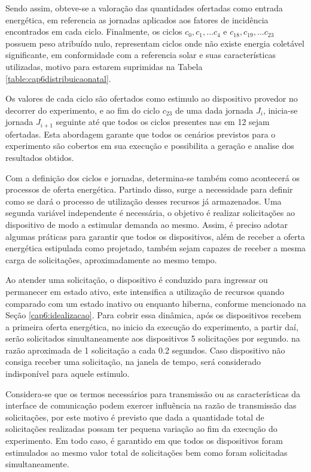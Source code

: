 Sendo assim, obteve-se a valoração das quantidades ofertadas como entrada energética, em referencia as jornadas aplicados aos fatores de incidência encontrados em cada ciclo. Finalmente, os ciclos $c_0, c_1,... c_4$ e $c_{18}, c_{19},... c_{23}$ possuem peso atribuído nulo, representam ciclos onde não existe energia coletável significante, em conformidade com a referencia solar e suas características utilizadas, motivo para estarem suprimidas na Tabela \ref{table:cap6distribuicaonatal}.

Os valores de cada ciclo são ofertados como estimulo ao dispositivo provedor no decorrer do experimento, e ao fim do ciclo $c_{23}$ de uma dada jornada $J_i$, inicia-se jornada $J_{i+1}$ seguinte até que todos os ciclos presentes nas em 12 sejam ofertadas. Esta abordagem garante que todos os cenários previstos para o experimento são cobertos em sua execução e possibilita a geração e analise dos resultados obtidos.

Com a definição dos ciclos e jornadas, determina-se também como acontecerá os processos de oferta energética. Partindo disso, surge a necessidade para definir como se dará o processo de utilização desses recursos já armazenados. Uma segunda variável independente é necessária, o objetivo é realizar solicitações ao dispositivo de modo a estimular demanda ao mesmo. Assim, é preciso adotar algumas práticas para garantir que todos os dispositivos, além de receber a oferta energética estipulada como projetado, também sejam capazes de receber a mesma carga de solicitações, aproximadamente ao mesmo tempo. 

Ao atender uma solicitação, o dispositivo é conduzido para ingressar ou permanecer em estado ativo, este intensifica a utilização de recursos quando comparado com um estado inativo ou enquanto hiberna, conforme mencionado na Seção \ref{cap6:idealizacao}. Para cobrir essa dinâmica, após os dispositivos recebem a primeira oferta energética, no inicio da execução do experimento, a partir daí, serão solicitados simultaneamente aos dispositivos 5 solicitações por segundo. na razão aproximada de 1 solicitação a cada 0.2 segundos. Caso dispositivo não consiga receber uma solicitação, na janela de tempo, será considerado indisponível para aquele estimulo. 

Considera-se que os termos necessários para transmissão ou as características da interface de comunicação podem exercer influência na razão de transmissão das solicitações, por este motivo é previsto que dada a quantidade total de solicitações realizadas possam ter pequena variação ao fim da execução do experimento. Em todo caso, é garantido em que todos os dispositivos foram estimulados ao mesmo valor total de solicitações bem como foram solicitadas simultaneamente.

